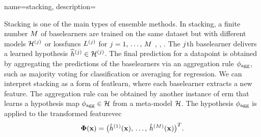 {name={stacking}, 
	description={Stacking is one of the main types of \gls{ensemble} methods.  
		In stacking, a finite number $M$ of \glspl{baselearner} are trained on the 
		same \gls{dataset} but with different \glspl{model} $\mathcal{H}^{(j)}$ 
		or \glspl{lossfunc} $L^{(j)}$ for $j=1,\,\ldots,\,M$ \cite[Ch. 8.8]{hastie01statisticallearning},
		\cite{WOLPERT1992241}, \cite{ZhouEnsemble2012}. 
		The $j$th \gls{baselearner} delivers a learned \gls{hypothesis} 
		$\widehat{h}^{(j)} \in \mathcal{H}^{(j)}$. 
		The final \gls{prediction} for a \gls{datapoint} is obtained by aggregating the 
		\glspl{prediction} of the \glspl{baselearner} via an aggregation rule $\phi_{\rm agg}$, 
		such as majority voting for \gls{classification} or averaging for \gls{regression}. 
		We can interpret stacking as a form of \gls{featlearn}, where each \gls{baselearner} 
		extracts a new \gls{feature}. The aggregation rule can be obtained by another instance 
		of \gls{erm} that learns a \gls{hypothesis} \gls{map} $\phi_{\rm agg} \in \mathcal{H}$ from 
		a meta-\gls{model} $\mathcal{H}$. The \gls{hypothesis} $\phi_{\rm agg}$ is applied to the 
		transformed \gls{featurevec} $${\bf \Phi}({\bf x})= \big( \hat{h}^{(1)}({\bf x}), 
       		\,\ldots, \,\hat{h}^{(M)}({\bf x}) \big)^{T}.$$
       		\begin{figure}[H]
			\begin{center}
\end{center}
\end{figure}}}
